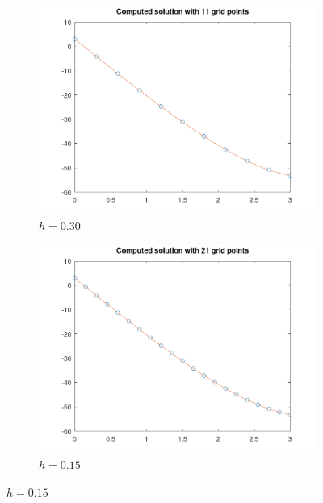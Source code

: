\begin{solution}
   \begin{figure}[h]
        \centering
        \begin{subfigure}[b]{0.475\textwidth}
            \centering
            \includegraphics[width=\textwidth]{problem4b_11_grid_points.png}
            \caption[]%
            {{\small $h = 0.30$}}    
            \label{fig:problem4b_11pt}
        \end{subfigure}
        \hfill
        \begin{subfigure}[b]{0.475\textwidth}
            \centering
            \includegraphics[width=\textwidth]{problem4b_21_grid_points.png}
            \caption[]%
            {{\small $h = 0.15$}}    
            \label{fig:problem4b_21pt}
        \end{subfigure}

\end{figure}
\end{solution}
